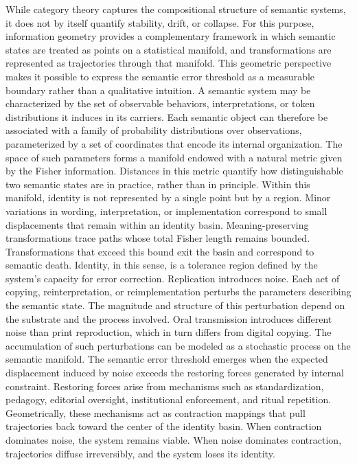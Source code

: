 \documentclass[11pt,oneside]{article}
\begin{document}
While category theory captures the compositional structure of semantic systems, it does not by itself quantify stability, drift, or collapse. For this purpose, information geometry provides a complementary framework in which semantic states are treated as points on a statistical manifold, and transformations are represented as trajectories through that manifold. This geometric perspective makes it possible to express the semantic error threshold as a measurable boundary rather than a qualitative intuition.
A semantic system may be characterized by the set of observable behaviors, interpretations, or token distributions it induces in its carriers. Each semantic object can therefore be associated with a family of probability distributions over observations, parameterized by a set of coordinates that encode its internal organization. The space of such parameters forms a manifold endowed with a natural metric given by the Fisher information. Distances in this metric quantify how distinguishable two semantic states are in practice, rather than in principle.
Within this manifold, identity is not represented by a single point but by a region. Minor variations in wording, interpretation, or implementation correspond to small displacements that remain within an identity basin. Meaning-preserving transformations trace paths whose total Fisher length remains bounded. Transformations that exceed this bound exit the basin and correspond to semantic death. Identity, in this sense, is a tolerance region defined by the system’s capacity for error correction.
Replication introduces noise. Each act of copying, reinterpretation, or reimplementation perturbs the parameters describing the semantic state. The magnitude and structure of this perturbation depend on the substrate and the process involved. Oral transmission introduces different noise than print reproduction, which in turn differs from digital copying. The accumulation of such perturbations can be modeled as a stochastic process on the semantic manifold.
The semantic error threshold emerges when the expected displacement induced by noise exceeds the restoring forces generated by internal constraint. Restoring forces arise from mechanisms such as standardization, pedagogy, editorial oversight, institutional enforcement, and ritual repetition. Geometrically, these mechanisms act as contraction mappings that pull trajectories back toward the center of the identity basin. When contraction dominates noise, the system remains viable. When noise dominates contraction, trajectories diffuse irreversibly, and the system loses its identity.
\end{document}
